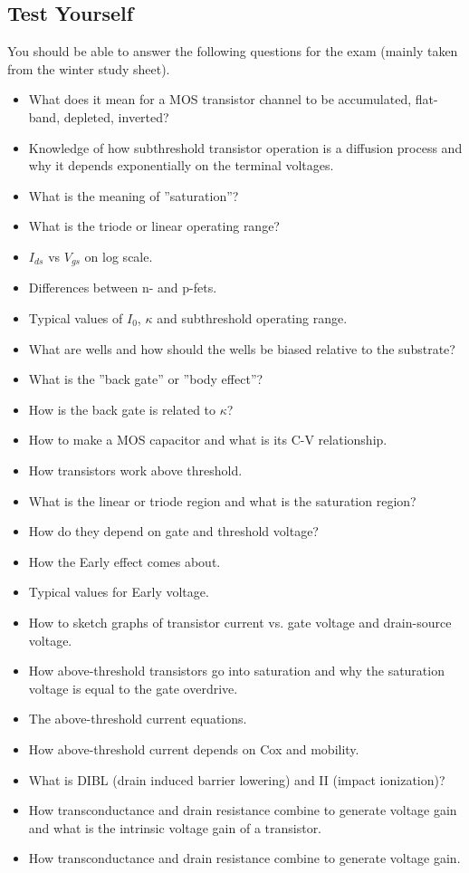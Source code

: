 \subsection{Test Yourself}

You should be able to answer the following questions for the exam (mainly taken from the winter study sheet).

\begin{itemize}
    \item What does it mean for a MOS transistor channel to be accumulated, flat-band, depleted, inverted?
    \item Knowledge of how subthreshold transistor operation is a diffusion process and why it
depends exponentially on the terminal voltages.
    \item What is the meaning of ”saturation”?
    \item What is the triode or linear operating range?
    \item $I_{ds}$ vs $V_{gs}$ on log scale.
    \item Differences between n- and p-fets.
    \item Typical values of $I_0$, $\kappa$ and subthreshold operating range.
    \item What are wells and how should the wells be biased relative to the substrate?
    \item What is the ”back gate” or ”body effect”?
    \item How is the back gate is related to $\kappa$?
    \item How to make a MOS capacitor and what is its C-V relationship.
    \item How transistors work above threshold.
    \item What is the linear or triode region and what is the saturation region?
    \item How do they depend on gate and threshold voltage?
    \item How the Early effect comes about.
    \item Typical values for Early voltage.
    \item How to sketch graphs of transistor current vs. gate voltage and drain-source voltage.
    \item How above-threshold transistors go into saturation and why the saturation voltage is equal to the gate overdrive.
    \item The above-threshold current equations.
    \item How above-threshold current depends on Cox and mobility.
    \item What is DIBL (drain induced barrier lowering) and II (impact ionization)?
    \item How transconductance and drain resistance combine to generate voltage gain and what is the intrinsic voltage gain of a transistor.
    \item How transconductance and drain resistance combine to generate voltage gain.
\end{itemize}